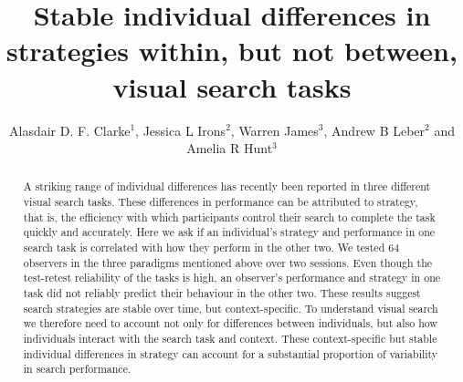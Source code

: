 \documentclass[]{rsos}%
\begin{document}
\title{Stable individual differences in strategies within, but not between, visual search tasks}

\author{%
Alasdair D. F. Clarke$^1$, Jessica L Irons$^2$, Warren James$^3$, Andrew B Leber$^2$ and Amelia R Hunt$^3$}

\address{$^{1}$Department of Psychology, University of Essex, Colchester, UK\\
$^{2}$Department of Psychology, The Ohio State University, Columbus, USA\\
$^{3}$School of Psychology, University of Aberdeen, Aberdeen, UK}

\subject{Behaviour, evolution}



\begin{abstract}
A striking range of individual differences has recently been reported in three different visual search tasks. These differences in performance can be attributed to strategy, that is, the efficiency with which participants control their search to complete the task quickly and accurately. Here we ask if an individual’s strategy and performance in one search task is correlated with how they perform in the other two. We tested 64 observers in the three paradigms mentioned above over two sessions. Even though the test-retest reliability of the tasks is high, an observer’s performance and strategy in one task did not reliably predict their behaviour in the other two. These results suggest search strategies are stable over time, but context-specific. To understand visual search we therefore need to account not only for differences between individuals, but also how individuals interact with the search task and context. These context-specific but stable individual differences in strategy can account for a substantial proportion of variability in search performance.
\end{abstract}

\end{document}
